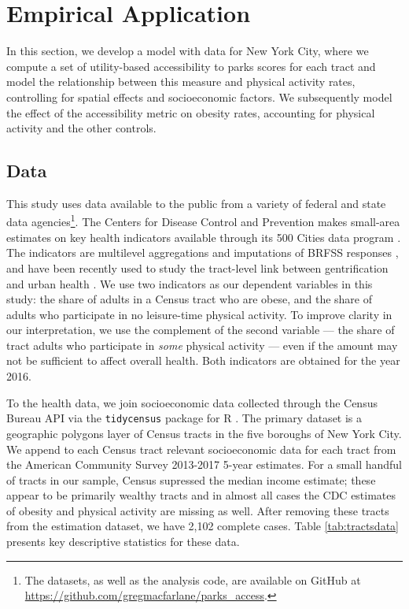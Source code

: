 \documentclass[shortAfour,sageh.bst]{sagej}
\begin{document}
\hypertarget{empirical-application}{%
\section{Empirical Application}\label{empirical-application}}

In this section, we develop a model with data for New York City, where
we compute a set of utility-based accessibility to parks scores for each
tract and model the relationship between this measure and physical
activity rates, controlling for spatial effects and socioeconomic
factors. We subsequently model the effect of the accessibility metric on
obesity rates, accounting for physical activity and the other controls.

\hypertarget{data}{%
\subsection{Data}\label{data}}

This study uses data available to the public from a variety of federal
and state data agencies\footnote{The datasets, as well as the analysis
  code, are available on GitHub at
  \url{https://github.com/gregmacfarlane/parks_access}.}. The Centers
for Disease Control and Prevention makes small-area estimates on key
health indicators available through its 500 Cities data program
\citep{CDC5002016}. The indicators are multilevel aggregations and
imputations of BRFSS responses \citep{Wang2018, Wang2017}, and have been
recently used to study the tract-level link between gentrification and
urban health \citep{Gibbons2018}. We use two indicators as our dependent
variables in this study: the share of adults in a Census tract who are
obese, and the share of adults who participate in no leisure-time
physical activity. To improve clarity in our interpretation, we use the
complement of the second variable --- the share of tract adults who
participate in \emph{some} physical activity --- even if the amount may
not be sufficient to affect overall health. Both indicators are obtained
for the year 2016.

To the health data, we join socioeconomic data collected through the
Census Bureau API via the \texttt{tidycensus} package for R
\citep{Walker2019}. The primary dataset is a geographic polygons layer
of Census tracts in the five boroughs of New York City. We append to
each Census tract relevant socioeconomic data for each tract from the
American Community Survey 2013-2017 5-year estimates. For a small
handful of tracts in our sample, Census supressed the median income
estimate; these appear to be primarily wealthy tracts and in almost all
cases the CDC estimates of obesity and physical activity are missing as
well. After removing these tracts from the estimation dataset, we have
2,102 complete cases. Table \ref{tab:tractsdata} presents key
descriptive statistics for these data.
\end{document}
